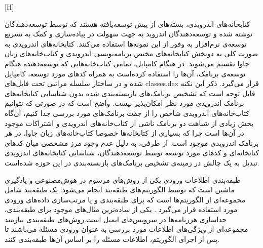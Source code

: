 

[H]
\vspace{1em}

کتابخانه‌های اندرویدی، بسته‌های از پیش توسعه‌یافته هستند که توسط توسعه‌دهندگان نوشته شده و توسعه‌دهندگان اندروید به جهت سهولت در پیاده‌سازی و کمک به تسریع توسعه‌ی نرم‌افزار به وفور از این نمونه‌ها استفاده می‌کنند. کتابخانه‌های اندرویدی به صورت کلی به دوبخش کتابخانه‌های مختص برنامه‌نویسی اندرویدی و کتاب‌خانه‌های زبان جاوا تقسیم می‌شوند. در هنگام کامپایل، تمامی کتاب‌خانه‌هایی که توسعه‌دهنده هنگام توسعه‌ی برنامک، آن‌ها را استفاده کرده‌است به همراه کد‌های مورد توسعه، کامپایل شده و در ساختار سلسله مراتبی تحت فایل‌های {classes.dex} قرار می‌گیرد. ذکر این نکته‌ قابل توجه است که تشخیص برنامک‌های بازبسته‌بندی شده بدون شناسایی کتابخانه‌های برنامک‌ اندرویدی مورد نظر امکان‌پذیر نیست. واضح است که در صورتی که نتوانیم کتاب‌خانه‌های اندرویدی شاخص را از جفت برنامک‌های مورد بررسی جدا کنیم، آن‌گاه بخش زیادی از شباهت دو برنامک ناشی از کتاب‌خانه‌های اندرویدی و اشتراکات موجود در آن‌ها است چرا که بسیاری از کتابخانه‌ها خصوصا کتاب‌خانه‌های زبان جاوا، در هر برنامک اندرویدی موجود است. از طرفی، به دلیل عدم وجود مرز مشخصی میان کد‌های کتابخانه‌ای و کد‌های مورد توسعه توسط توسعه‌دهندگان، شناسایی کتابخانه‌های اندرویدی  تبدیل به یک چالش در زمینه‌ی تشخیص برنامک‌های بازبسته‌بندی در این حوزه شده‌است.

طبقه‌بندی اطلاعات ورودی یکی از روش‌های مرسوم در هوش‌مصنوعی و یاد‌گیری ماشین است که توسط الگوریتم‌های طبقه‌بند انجام می‌شود. یک طبقه‌بند شامل مجموعه‌ای از الگوریتم‌ها است که برای طبقه‌بندی و یا مرتب‌سازی داده‌های ورودی مورد استفاده قرار می‌گیرد . یکی از ساده‌ترین مثال‌های موجود برای طبقه‌بندی، جدا‌سازی هرزنامه‌ها در سرویس‌های ایمیل است.روش‌های طبقه‌بندی نیازمند مجموعه‌ای از ویژگی‌های اطلاعات مورد بررسی به عنوان ورودی مسئله‌ می‌باشند تا پس از اجرای الگوریتم، اطلاعات مسئله‌ را بر اساس آن‌ها طبقه‌بندی کنند.



